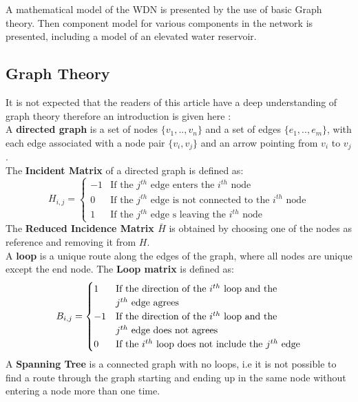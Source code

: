 A mathematical model of the WDN is presented by the use of basic Graph theory. Then component model for various components in the network is presented, including a model of an elevated water reservoir. 

\subsection{Graph Theory}
It is not expected that the readers of this article have a deep understanding of graph theory therefore an introduction is given here \cite[Chap. 9]{Deo}:\\  
 
A \textbf{directed graph} is a set of nodes $ \{v_1,..,v_n\} $ and a set of edges $ \{e_1,..,e_m\} $, with each edge associated with a node pair $ \{v_i,v_j\} $ and an arrow pointing from $ v_i $ to $ v_j $. \\

The \textbf{Incident Matrix} of a directed graph is defined as:
\begin{equation*}
	H_{i,j} = \begin{cases}
		-1 & \text{If the $j^{th}$ edge enters the $i^{th}$ node} \\
		0 & \text{If the $j^{th}$ edge is not connected to the $i^{th}$ node} \\
		1 & \text{If the $j^{th}$ edge s leaving the $i^{th}$ node}
	\end{cases}
\end{equation*} %
The \textbf{Reduced Incidence Matrix $\bar{H}$} is obtained by choosing one of the nodes as reference and removing it from $ H $.\\

A \textbf{loop} is a unique route along the edges of the graph, where all nodes are unique except the end node. The \textbf{Loop matrix} is defined as:
\begin{equation*}
	B_{i,j} = \begin{cases}
		1 & \text{If the direction of the $ i^{th} $ loop and the} \\& \text{$j^{th}$ edge agrees}\\
		-1 & \text{If the direction of the $ i^{th} $ loop and the} \\& \text{$j^{th}$ edge does not agrees}\\
		0 & \text{If the $ i^{th} $ loop does not include the $ j^{th} $ edge}\\
\end{cases}
\end{equation*}
A \textbf{Spanning Tree} is a connected graph with no loops, i.e it is not possible to find a route through the graph starting and ending up in the same node without entering a node more than one time. \\

